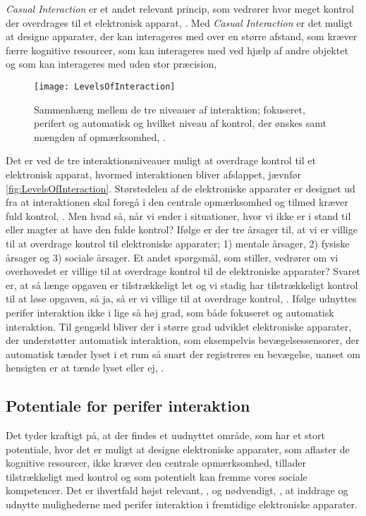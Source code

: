 \textit{Casual Interaction} er et andet relevant princip, som vedrører hvor meget kontrol der overdrages til et elektronisk apparat, \parencite[ss. 118-119]{PDF:PICasualInteractionKap6}. Med \textit{Casual Interaction} er det muligt at designe apparater, der kan interageres med over en større afstand, som kræver færre kognitive resourcer, som kan interageres med ved hjælp af andre objektet og som kan interageres med uden stor præcision, \parencite[s. 128]{PDF:PICasualInteractionKap6}        
%
\begin{figure}[H]
	\centering
	\texttt{[image: LevelsOfInteraction]}
	\caption{Sammenhæng mellem de tre niveauer af interaktion; fokuseret, perifert og automatisk og hvilket niveau af kontrol, der ønskes samt mængden af opmærksomhed, \parencite[s. 118]{PDF:PICasualInteractionKap6}.}
	\label{fig:LevelsOfInteraction}
\end{figure}
\noindent
%
Det er ved de tre interaktionsniveauer muligt at overdrage kontrol til et elektronisk apparat, hvormed interaktionen bliver afslappet, jævnfør \autoref{fig:LevelsOfInteraction}. Størstedelen af de elektroniske apparater er designet ud fra at interaktionen skal foregå i den centrale opmærksomhed og tilmed kræver fuld kontrol, \parencite[s. 118]{PDF:PICasualInteractionKap6}. Men hvad så, når vi ender i situationer, hvor vi ikke er i stand til eller magter at have den fulde kontrol? Ifølge \textcite[s. 123]{PDF:PICasualInteractionKap6} er der tre årsager til, at vi er villige til at overdrage kontrol til elektroniske apparater; 1) mentale årsager, 2) fysiske årsager og 3) sociale årsager. Et andet spørgsmål, som \textcite[s. 124]{PDF:PICasualInteractionKap6} stiller, vedrører om vi overhovedet er villige til at overdrage kontrol til de elektroniske apparater? Svaret er, at så længe opgaven er tilstrækkeligt let og vi stadig har tilstrækkeligt kontrol til at løse opgaven, så ja, så er vi villige til at overdrage kontrol, \parencite[s. 124]{PDF:PICasualInteractionKap6}.\blankline
%
Ifølge \textcite[s. 6]{PDF:PIIntroduction} udnyttes perifer interaktion ikke i lige så høj grad, som både fokuseret og automatisk interaktion. Til gengæld bliver der i større grad udviklet elektroniske apparater, der understøtter automatisk interaktion, som eksempelvis bevægelsessensorer, der automatisk tænder lyset i et rum så snart der registreres en bevægelse, uanset om hensigten er at tænde lyset eller ej, \parencite[s. 5]{PDF:PIIntroduction}.
% 
\subsection{Potentiale for perifer interaktion}
\label{Potentiale}
%
Det tyder kraftigt på, at der findes et uudnyttet område, som har et stort potentiale, hvor det er muligt at designe elektroniske apparater, som aflaster de kognitive resourcer, ikke kræver den centrale opmærksomhed, tillader tilstrækkeligt med kontrol og som potentielt kan fremme vores sociale kompetencer. Det er ihvertfald højst relevant, \parencite[s. 239]{PDF:PICharacteristicsAndConsiderations}, og nødvendigt, \parencite[s. 3]{PDF:TheComingAgeOfCalmTech}, at inddrage og udnytte mulighederne med perifer interaktion i fremtidige elektroniske apparater. 

